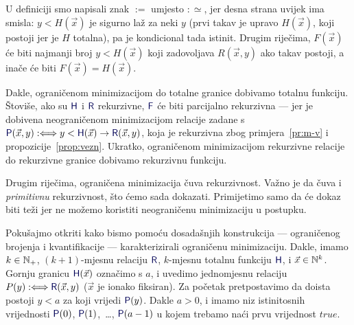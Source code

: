 \begin{napomena}[{name=[ograničena minimizacija čuva rekurzivnost]}]\label{nap:min=H}
U definiciji smo napisali znak $:=$ umjesto $:\simeq$, jer desna strana uvijek ima smisla: $y<H(\vec x)$ je sigurno laž za neki $y$ (prvi takav je upravo $H(\vec x)$, koji postoji jer je $H$ totalna), pa je kondicional tada istinit. Drugim riječima, $F(\vec x)$ će biti najmanji broj $y<H(\vec x)$ koji zadovoljava $R(\vec x,y)$ ako takav postoji, a inače će biti $F(\vec x)=H(\vec x)$.

Dakle, ograničenom minimizacijom do totalne granice dobivamo totalnu funkciju. Štoviše, ako su $\f H$ i $\f R$ rekurzivne, $\f F$ će biti parcijalno rekurzivna --- jer je dobivena neograničenom minimizacijom relacije zadane s $\f P(\vec x,y):\Longleftrightarrow y<\f H(\vec x)\to\f R(\vec x,y)$, koja je rekurzivna zbog primjera~\ref{pr:m-v} i propozicije~\ref{prop:vezn}. Ukratko, ograničenom minimizacijom rekurzivne relacije do rekurzivne granice
dobivamo rekurzivnu funkciju.
\end{napomena}

Drugim riječima, ograničena minimizacija čuva rekurzivnost. Važno je da čuva i \emph{primitivnu} rekurzivnost, što ćemo sada dokazati. Primijetimo samo da će dokaz biti teži jer ne možemo koristiti neograničenu minimizaciju u postupku.


Pokušajmo otkriti kako bismo pomoću dosadašnjih konstrukcija --- ograničenog brojenja i kvantifikacije --- karakterizirali ograničenu minimizaciju. Dakle, imamo $k\in{\mathbb N}_+$, $(k+1)$-mjesnu relaciju $\f R$, $k$-mjesnu totalnu funkciju $\f H$, i $\vec x\in{\mathbb N}^k$. Gornju granicu $\f H(\vec x)$ označimo s $a$, i uvedimo jednomjesnu relaciju $P(y):\Longleftrightarrow\f R(\vec x,y)$ ($\vec x$ je ionako fiksiran). Za početak pretpostavimo da doista postoji $y<a$ za koji vrijedi $\f P(y)$. Dakle $a>0$, i imamo niz istinitosnih vrijednosti $\f P(0)$, $\f P(1)$,~\ldots, $\f P(a-1)$ u kojem trebamo naći prvu vrijednost $\mathit{true}$.

